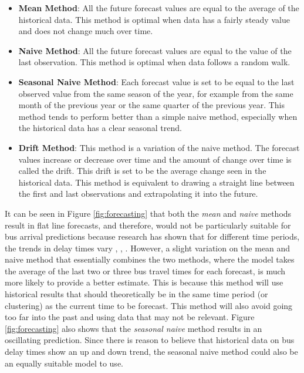\documentclass[12pt, a4paper]{article}
\begin{document}
\begin{itemize}
    \item \textbf{Mean Method}: All the future forecast values are equal to the average of the historical data. This method is optimal when data has a fairly steady value and does not change much over time.
    \item \textbf{Naive Method}: All the future forecast values are equal to the value of the last observation. This method is optimal when data follows a random walk.
    \item \textbf{Seasonal Naive Method}: Each forecast value is set to be equal to the last observed value from the same season of the year, for example from the same month of the previous year or the same quarter of the previous year. This method tends to perform better than a simple naive method, especially when the historical data has a clear seasonal trend. 
    \item \textbf{Drift Method}: This method is a variation of the naive method. The forecast values increase or decrease over time and the amount of change over time is called the drift. This drift is set to be the average change seen in the historical data. This method is equivalent to drawing a straight line between the first and last observations and extrapolating it into the future. 
\end{itemize}

It can be seen in Figure \ref{fig:forecasting} that both the \textit{mean} and \textit{naive} methods result in flat line forecasts, and therefore, would not be particularly suitable for bus arrival predictions because research has shown that for different time periods, the trends in delay times vary \cite{dynamic-gps}, \cite{ann-prediction}, \cite{smart-public-transport}. However, a slight variation on the mean and naive method that essentially combines the two methods, where the model takes the average of the last two or three bus travel times for each forecast, is much more likely to provide a better estimate. This is because this method will use historical results that should theoretically be in the same time period (or clustering) as the current time to be forecast. This method will also avoid going too far into the past and using data that may not be relevant. Figure \ref{fig:forecasting} also shows that the \textit{seasonal naive} method results in an oscillating prediction. Since there is reason to believe that historical data on bus delay times show an up and down trend, the seasonal naive method could also be an equally suitable model to use.
\end{document}
